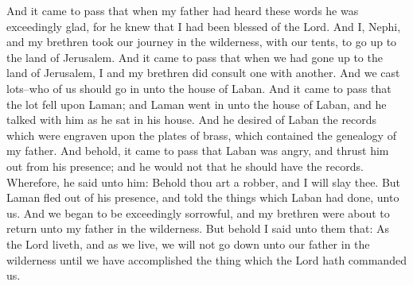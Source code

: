 And it came to pass that when my father had heard these words he was exceedingly glad, for he knew that I had been blessed of the Lord.
\bverse \iffalse And I, Nephi, and my brethren took our journey in the wilderness, with our tents, to go up to the land of Jerusalem. \fi
And I, Nephi, and my brethren took our journey in the wilderness, with our tents, to go up to the land of Jerusalem.
\bverse \iffalse And it came to pass that when we had gone up to the land of Jerusalem, I and my brethren did consult one with another. \fi
And it came to pass that when we had gone up to the land of Jerusalem, I and my brethren did consult one with another.
\bverse \iffalse And we cast lots--who of us should go in unto the house of Laban. And it came to pass that the lot fell upon Laman; and Laman went in unto the house of Laban, and he talked with him as he sat in his house. \fi
And we cast lots--who of us should go in unto the house of Laban. And it came to pass that the lot fell upon Laman; and Laman went in unto the house of Laban, and he talked with him as he sat in his house.
\bverse \iffalse And he desired of Laban the records which were engraven upon the plates of brass, which contained the genealogy of my father. \fi
And he desired of Laban the records which were engraven upon the plates of brass, which contained the genealogy of my father.
\bverse \iffalse And behold, it came to pass that Laban was angry, and thrust him out from his presence; and he would not that he should have the records. Wherefore, he said unto him: Behold thou art a robber, and I will slay thee. \fi
And behold, it came to pass that Laban was angry, and thrust him out from his presence; and he would not that he should have the records. Wherefore, he said unto him: Behold thou art a robber, and I will slay thee.
\bverse \iffalse But Laman fled out of his presence, and told the things which Laban had done, unto us. And we began to be exceedingly sorrowful, and my brethren were about to return unto my father in the wilderness. \fi
But Laman fled out of his presence, and told the things which Laban had done, unto us. And we began to be exceedingly sorrowful, and my brethren were about to return unto my father in the wilderness.
\bverse \iffalse But behold I said unto them that: As the Lord liveth, and as we live, we will not go down unto our father in the wilderness until we have accomplished the thing which the Lord hath commanded us. \fi
But behold I said unto them that: As the Lord liveth, and as we live, we will not go down unto our father in the wilderness until we have accomplished the thing which the Lord hath commanded us.
